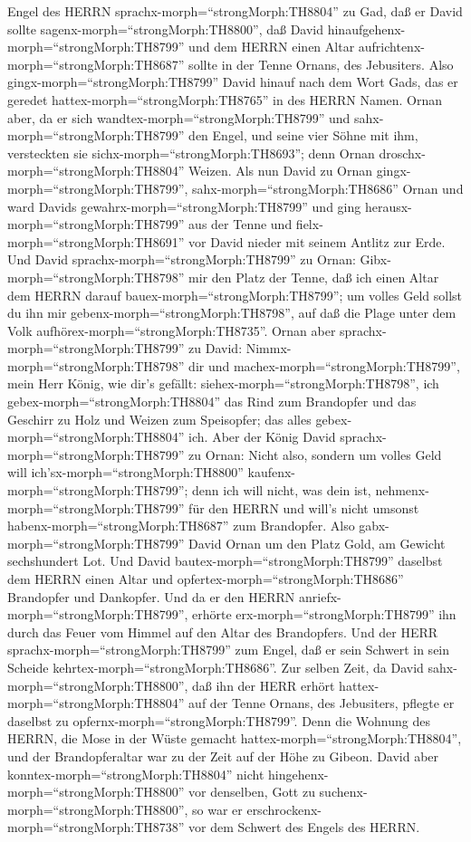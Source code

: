 Engel des HERRN sprachx-morph=``strongMorph:TH8804'' zu Gad, daß er
David sollte sagenx-morph=``strongMorph:TH8800'', daß David
hinaufgehenx-morph=``strongMorph:TH8799'' und dem HERRN einen Altar
aufrichtenx-morph=``strongMorph:TH8687'' sollte in der Tenne Ornans, des
Jebusiters.  Also gingx-morph=``strongMorph:TH8799'' David
hinauf nach dem Wort Gads, das er geredet
hattex-morph=``strongMorph:TH8765'' in des HERRN Namen. 
Ornan aber, da er sich wandtex-morph=``strongMorph:TH8799'' und
sahx-morph=``strongMorph:TH8799'' den Engel, und seine vier Söhne mit
ihm, versteckten sie sichx-morph=``strongMorph:TH8693''; denn Ornan
droschx-morph=``strongMorph:TH8804'' Weizen.  Als nun David
zu Ornan gingx-morph=``strongMorph:TH8799'',
sahx-morph=``strongMorph:TH8686'' Ornan und ward Davids
gewahrx-morph=``strongMorph:TH8799'' und ging
herausx-morph=``strongMorph:TH8799'' aus der Tenne und
fielx-morph=``strongMorph:TH8691'' vor David nieder mit seinem Antlitz
zur Erde.  Und David sprachx-morph=``strongMorph:TH8799''
zu Ornan: Gibx-morph=``strongMorph:TH8798'' mir den Platz der Tenne, daß
ich einen Altar dem HERRN darauf bauex-morph=``strongMorph:TH8799''; um
volles Geld sollst du ihn mir gebenx-morph=``strongMorph:TH8798'', auf
daß die Plage unter dem Volk aufhörex-morph=``strongMorph:TH8735''.
 Ornan aber sprachx-morph=``strongMorph:TH8799'' zu David:
Nimmx-morph=``strongMorph:TH8798'' dir und
machex-morph=``strongMorph:TH8799'', mein Herr König, wie dir's gefällt:
siehex-morph=``strongMorph:TH8798'', ich
gebex-morph=``strongMorph:TH8804'' das Rind zum Brandopfer und das
Geschirr zu Holz und Weizen zum Speisopfer; das alles
gebex-morph=``strongMorph:TH8804'' ich.  Aber der König
David sprachx-morph=``strongMorph:TH8799'' zu Ornan: Nicht also, sondern
um volles Geld will ich'sx-morph=``strongMorph:TH8800''
kaufenx-morph=``strongMorph:TH8799''; denn ich will nicht, was dein ist,
nehmenx-morph=``strongMorph:TH8799'' für den HERRN und will's nicht
umsonst habenx-morph=``strongMorph:TH8687'' zum Brandopfer.
 Also gabx-morph=``strongMorph:TH8799'' David Ornan um den
Platz Gold, am Gewicht sechshundert Lot.  Und David
bautex-morph=``strongMorph:TH8799'' daselbst dem HERRN einen Altar und
opfertex-morph=``strongMorph:TH8686'' Brandopfer und Dankopfer. Und da
er den HERRN anriefx-morph=``strongMorph:TH8799'', erhörte
erx-morph=``strongMorph:TH8799'' ihn durch das Feuer vom Himmel auf den
Altar des Brandopfers.  Und der HERR
sprachx-morph=``strongMorph:TH8799'' zum Engel, daß er sein Schwert in
sein Scheide kehrtex-morph=``strongMorph:TH8686''.  Zur
selben Zeit, da David sahx-morph=``strongMorph:TH8800'', daß ihn der
HERR erhört hattex-morph=``strongMorph:TH8804'' auf der Tenne Ornans,
des Jebusiters, pflegte er daselbst zu
opfernx-morph=``strongMorph:TH8799''.  Denn die Wohnung des
HERRN, die Mose in der Wüste gemacht
hattex-morph=``strongMorph:TH8804'', und der Brandopferaltar war zu der
Zeit auf der Höhe zu Gibeon.  David aber
konntex-morph=``strongMorph:TH8804'' nicht
hingehenx-morph=``strongMorph:TH8800'' vor denselben, Gott zu
suchenx-morph=``strongMorph:TH8800'', so war er
erschrockenx-morph=``strongMorph:TH8738'' vor dem Schwert des Engels des
HERRN.

